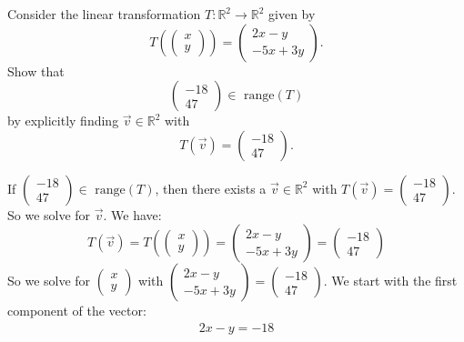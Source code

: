 \documentclass[12pt]{article}
\newenvironment{problem}[2][Problem]
{
	\begin{trivlist} 
		\item[\hskip \labelsep {\bfseries #1 #2:}]
	}
{
	\end{trivlist}
	}
\newenvironment{solution}[1][Solution]
{
	\begin{trivlist} 
		\item[\hskip \labelsep {\itshape #1:}]
	}
	{
	\end{trivlist}
}
\begin{document}
\newpage
\begin{problem}{4}
Consider the linear transformation $T:\mathbb{R} ^2 \to \mathbb{R} ^2$ given by
\[
T\left(\begin{pmatrix} x \\ y\end{pmatrix} \right)=\begin{pmatrix} 2x-y \\ -5x+3y\end{pmatrix} \text{.}
\]
Show that
\[
\begin{pmatrix} -18 \\ 47\end{pmatrix} \in \text{ range}(T)
\]
by explicitly finding $\vec{v} \in \mathbb{R}^2$ with
\[
T(\vec{v})=\begin{pmatrix} -18 \\ 47\end{pmatrix} \text{.}
\]
\begin{solution}
If $\begin{pmatrix} -18 \\ 47\end{pmatrix} \in \text{ range}(T)$, then there exists a $\vec{v} \in \mathbb{R}^2$ with $T(\vec{v}) = \begin{pmatrix} -18 \\ 47\end{pmatrix}$. So we solve for $\vec{v}$. We have:
\[
T(\vec{v}) = T\left(\begin{pmatrix} x \\ y\end{pmatrix} \right) = \begin{pmatrix} 2x-y \\ -5x+3y\end{pmatrix} = \begin{pmatrix} -18 \\ 47\end{pmatrix}
\]
So we solve for $\begin{pmatrix} x\\y \end{pmatrix}$ with $ \begin{pmatrix} 2x-y \\ -5x+3y\end{pmatrix} = \begin{pmatrix} -18 \\ 47\end{pmatrix}$. We start with the first component of the vector:
\begin{align*}
2x - y = -18\\

\end{align*}
\end{solution}
\end{problem}
\end{document}
